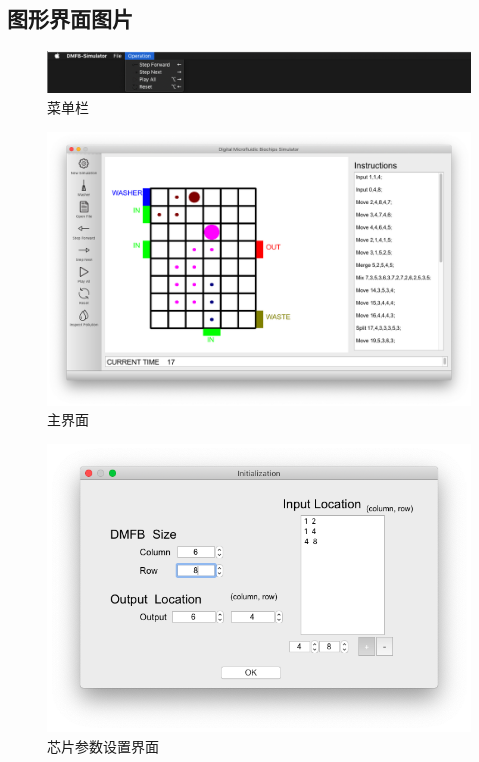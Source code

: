\documentclass[12pt, a4paper]{article}
\begin{document}
		\begin{appendices}
			\section{图形界面图片}
			
			\begin{figure}[htbp]
				\centering
				\includegraphics[width=15cm]{Img/menu.png}
				\caption{菜单栏}
			\end{figure}
		
			\begin{figure}[htbp]
				\centering
				\includegraphics[width=15cm]{Img/main.png}
				\caption{主界面}
			\end{figure}
		
			\begin{figure}[htbp]
				\centering
				\includegraphics[width=15cm]{Img/init.png}
				\caption{芯片参数设置界面}
			\end{figure}
		

\end{appendices}
\end{document}
